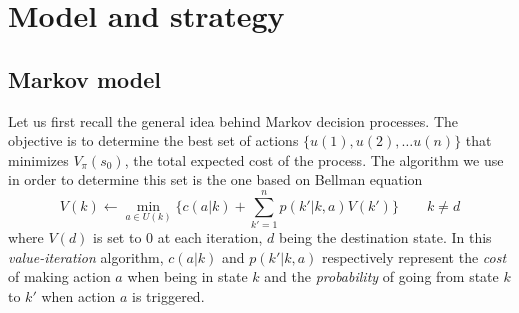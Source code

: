 \section{Model and strategy} %
\label{sec:model_and_strategy}


% 
% 
% 
% 

\subsection{Markov model} %
\label{sub:markov_model}
Let us first recall the general idea behind Markov decision processes.
The objective is to determine the best set of actions $\{u(1), u(2), \dots
u(n)\}$ that minimizes $V_{\pi}(s_0)$, the total expected cost of the process.
The algorithm we use in order to determine this set is the one based on Bellman equation
\[
  V(k) \leftarrow \min_{a\in U(k)} \{c(a|k) 
  + \sum_{k'=1}^n p(k'|k,a)V(k') \} \qquad k \neq d
\]
where $V(d)$ is set to 0 at each iteration, $d$ being the destination state.
In this \emph{value-iteration} algorithm, $c(a|k)$ and $p(k'|k,a)$
respectively represent the \emph{cost} of making action $a$
when being in state $k$ and the \emph{probability} of going
from state $k$ to $k'$ when action $a$ is triggered.

